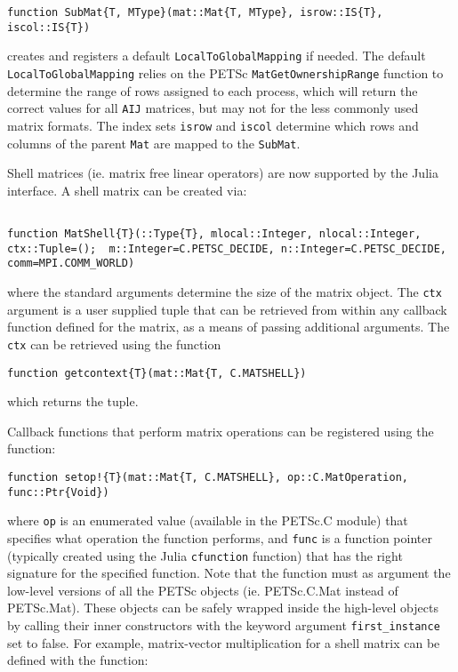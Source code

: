 \documentclass{article}
\begin{document}
\begin{verbatim}
function SubMat{T, MType}(mat::Mat{T, MType}, isrow::IS{T}, iscol::IS{T})
\end{verbatim}

\noindent creates and registers a default \texttt{LocalToGlobalMapping} if needed.  
The default \texttt{LocalToGlobalMapping} relies on the PETSc 
\texttt{MatGetOwnershipRange} function to determine the range of rows
assigned to each process, which will return the correct values for all 
\texttt{AIJ} matrices, but may not for the less commonly used matrix formats.
The index sets \texttt{isrow} and \texttt{iscol} determine which rows and
columns of the parent \texttt{Mat} are mapped to the \texttt{SubMat}.

Shell matrices (ie. matrix free linear operators) are now supported by the 
Julia interface.  A shell matrix can be created via:

\begin{verbatim}

function MatShell{T}(::Type{T}, mlocal::Integer, nlocal::Integer, ctx::Tuple=();  m::Integer=C.PETSC_DECIDE, n::Integer=C.PETSC_DECIDE, comm=MPI.COMM_WORLD)
\end{verbatim}

\noindent where the standard arguments determine the size of the matrix object.
The \texttt{ctx} argument is a user supplied tuple that can be retrieved from 
within any callback function defined for the matrix, as a means of passing
additional arguments.  The \texttt{ctx} can be retrieved using the function

\begin{verbatim}
function getcontext{T}(mat::Mat{T, C.MATSHELL})
\end{verbatim}

\noindent which returns the tuple.

Callback functions that perform matrix operations can be registered using 
the function:

\begin{verbatim}
function setop!{T}(mat::Mat{T, C.MATSHELL}, op::C.MatOperation, func::Ptr{Void})
\end{verbatim}

\noindent where \texttt{op} is an enumerated value (available in the PETSc.C module) that specifies what operation the function performs, and
\texttt{func} is a function pointer (typically created using the Julia \texttt{cfunction} function) that has the right signature for the specified function.
Note that the function must as argument the low-level versions of all the PETSc
objects (ie. PETSc.C.Mat instead of PETSc.Mat).  These objects can be safely
wrapped inside the high-level objects by calling their inner constructors with
the keyword argument \texttt{first\_instance} set to false.  For example, 
matrix-vector multiplication for a shell matrix can be defined with the 
function:
\end{document}
